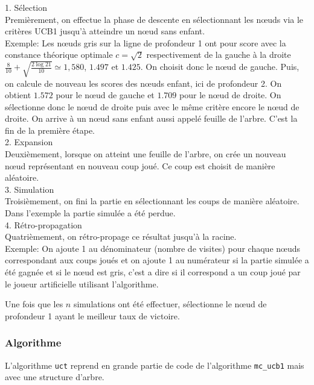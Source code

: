 \documentclass[a4paper]{article}
\theoremstyle{definition}
\begin{document}
1. Sélection\\
Premièrement, on effectue la phase de descente en sélectionnant les nœuds via le critères UCB1 jusqu'à atteindre un nœud sans enfant.\\
Exemple: Les nœuds gris sur la ligne de profondeur 1 ont pour score avec la constance théorique optimale $c=\sqrt{2}$ respectivement de la gauche à la droite $\frac{8}{10} + \sqrt{\frac{2\log21}{10}} \simeq 1,580$, $1.497$ et $1.425$. On choisit donc le nœud de gauche. Puis, on calcule de nouveau les scores des nœuds enfant, ici de profondeur 2. On obtient $1.572$ pour le nœud de gauche et $1.709$ pour le nœud de droite. On sélectionne donc le nœud de droite puis avec le même critère encore le nœud de droite. On arrive à un nœud sans enfant aussi appelé feuille de l'arbre. C'est la fin de la première étape.
\\

2. Expansion\\
Deuxièmement, lorsque on atteint une feuille de l'arbre, on crée un nouveau nœud représentant en nouveau coup joué. Ce coup est choisit de manière aléatoire.\\

3. Simulation\\
Troisièmement, on fini la partie en sélectionnant les coups de manière aléatoire. Dans l'exemple la partie simulée a été perdue.\\

4. Rétro-propagation\\
Quatrièmement, on rétro-propage ce résultat jusqu'à la racine.\\
Exemple: On ajoute 1 au dénominateur (nombre de visites) pour chaque nœuds correspondant aux coups joués et on ajoute 1 au numérateur si la partie simulée a été gagnée et si le nœud est gris, c'est a dire si il correspond a un coup joué par le joueur artificielle utilisant l'algorithme.

Une fois que les $n$ simulations ont été effectuer, sélectionne le nœud de profondeur 1 ayant le meilleur taux de victoire.

\subsubsection{Algorithme}

L'algorithme \texttt{uct} reprend en grande partie de code de l'algorithme \texttt{mc\_ucb1} mais avec une structure d'arbre.
\end{document}
